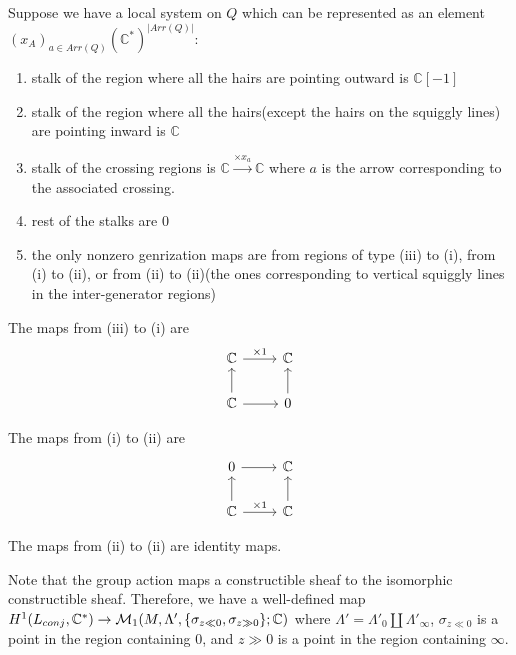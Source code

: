 \begin{definition}
Suppose we have a local system on $Q$ which can be represented as an element $(x_A)_{a\in Arr(Q)}(\mathbb{C}^*)^{|Arr(Q)|}$:

\begin{enumerate}[label= (\roman*)]
\item stalk of the region where all the hairs are pointing outward is $\mathbb{C}[-1]$

\item stalk of the region where all the hairs(except the hairs on the squiggly lines) are pointing inward is $\mathbb{C}$

\item stalk of the crossing regions is $\mathbb{C}\xrightarrow{\times x_a}\mathbb{C}$ where $a$ is the arrow corresponding to the associated crossing.

\item rest of the stalks are $0$

\item the only nonzero genrization maps are from regions of type (\Rn{3}) to (\Rn{1}), from (\Rn{1}) to (\Rn{2}), or from (\Rn{2}) to (\Rn{2})(the ones corresponding to vertical squiggly lines in the inter-generator regions)
\end{enumerate}

The maps from (\Rn{3}) to (\Rn{1}) are
\[
  \begin{tikzcd}
    \mathbb{C} \arrow{r}{\times 1} & \mathbb{C} \\
    \mathbb{C}\arrow{u}{} \arrow{r}{}& 0\arrow{u}{}
  \end{tikzcd}
\]

The maps from (\Rn{1}) to (\Rn{2}) are
\[
  \begin{tikzcd}
	0 \arrow{r}{} & \mathbb{C} \\
    \mathbb{C}\arrow{u}{} \arrow{r}{\times 1}& \mathbb{C}\arrow{u}{}
  \end{tikzcd}
\]

The maps from (\Rn{2}) to (\Rn{2}) are identity maps.
\end{definition}

Note that the group action maps a constructible sheaf to the isomorphic constructible sheaf. Therefore, we have a well-defined map
$H^1(L_{conj},\mathbb{C}^*)\rightarrow \mathcal{M}_1(M,\Lambda',\{\sigma_{z\ll 0},\sigma_{z\gg 0}\};\mathbb{C})$ where $\Lambda' = \Lambda'_0 \coprod \Lambda'_\infty$, $\sigma_{z\ll 0}$ is a point in the region containing $0$, and $z\gg 0$ is a point in the region containing $\infty$.
\pagebreak
